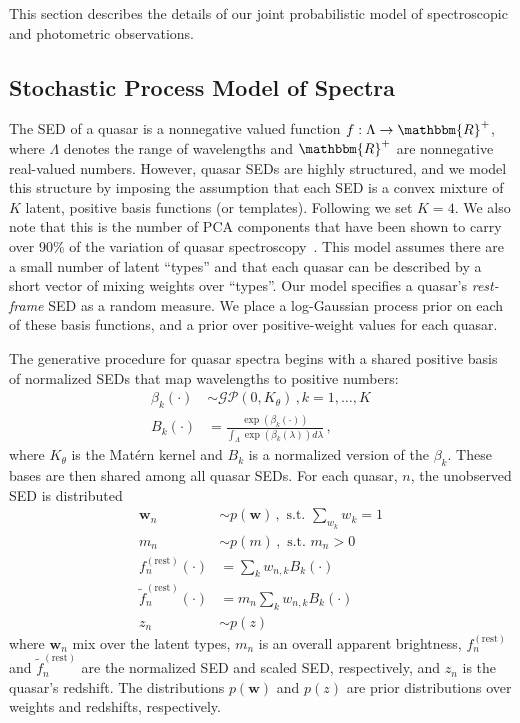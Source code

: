 \documentclass{article}
\newcommand{\R}{\mathbbm{R}}
\begin{document}
\label{sec:model}
This section describes the details of our joint probabilistic model of spectroscopic and photometric observations.  

\subsection{Stochastic Process Model of Spectra}
The SED of a quasar is a nonnegative valued function $f : \Lambda \rightarrow \R^+$, where $\Lambda$ denotes the range of wavelengths and $\R^+$ are nonnegative real-valued numbers.  However, quasar SEDs are highly structured, and we model this structure by imposing the assumption that each SED is a convex mixture of $K$ latent, positive basis functions (or templates). 
Following \citet{budavari2001photometric} we set $K = 4$.  We also note that this is the number of PCA components that have been shown to carry over 90\% of the variation of quasar spectroscopy~\citet{suzuki2006quasar}. 
This model assumes there are a small number of latent ``types'' and that each quasar can be described by a short vector of mixing weights over ``types''. 
Our model specifies a quasar's \emph{rest-frame} SED as a random measure. 
We place a log-Gaussian process prior on each of these basis functions, and a prior over positive-weight values for each quasar.  

The generative procedure for quasar spectra begins with a shared positive basis of normalized SEDs
that map wavelengths to positive numbers:
\begin{align}
  \beta_k(\cdot) &\sim \mathcal{GP}(0, K_\theta) \, , k=1, \dots, K\\
  B_k(\cdot) &= \frac{\exp(\beta_k(\cdot))}{\int_\Lambda \exp(\beta_k(\lambda)) d\lambda}   \, ,
\end{align}
where $K_{\theta}$ is the Mat\'{e}rn kernel and $B_k$ is a normalized version of
the $\beta_k$. These bases are then shared among all quasar SEDs.  For each quasar, $n$, the unobserved SED is distributed
\begin{align}
  \mathbf{w}_n &\sim p(\mathbf{w}) \, , \text{ s.t. } \sum_{w_k} w_k = 1  \\
  m_n  &\sim p(m) \, , \text{ s.t. } m_n > 0 \\
  f^{(\text{rest})}_n(\cdot) &= \sum_{k} w_{n,k} B_k(\cdot)\\
  \tilde f^{(\text{rest})}_n(\cdot) &= m_n \sum_{k} w_{n,k} B_k(\cdot)\label{eqn:restsed} \\
  z_n &\sim p(z)
\end{align}
where $\mathbf{w}_n$ mix over the latent types, $m_n$ is an overall apparent brightness, $f_n^{(\text{rest})}$ and $\tilde f_n^{(\text{rest})}$ are the normalized SED and scaled SED, respectively, and $z_n$ is the quasar's redshift.  The distributions $p(\mathbf{w})$ and $p(z)$ are prior distributions over weights and redshifts, respectively.  
\end{document}
